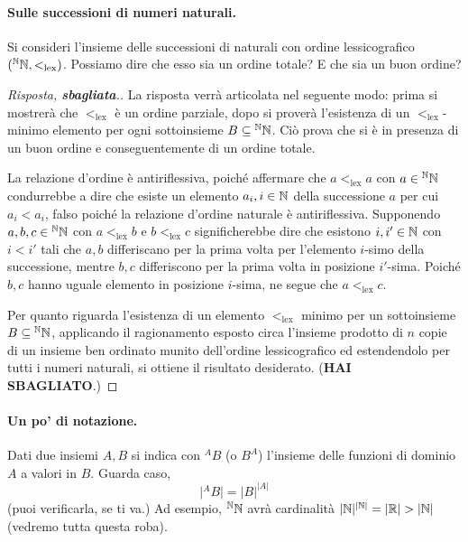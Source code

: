 \paragraph{Sulle successioni di numeri naturali.} Si consideri l'insieme delle successioni di naturali con ordine lessicografico \(({}^{\mathbb{N}}\mathbb{N}, <_{\mathrm{lex}})\). Possiamo dire che esso sia un ordine totale? E che sia un buon ordine?
\begin{proof}[Risposta, {\bf sbagliata}.]
  La risposta verrà articolata nel seguente modo: prima si mostrerà che \(<_{\mathrm{lex}}\) è un ordine parziale, dopo si proverà l'esistenza di un \(<_{\mathrm{lex}}\)-minimo elemento per ogni sottoinsieme \(B \subseteq {}^{\mathbb{N}}\mathbb{N}\). Ciò prova che si è in presenza di un buon ordine e conseguentemente di un ordine totale.

  La relazione d'ordine è antiriflessiva, poiché affermare che \(a <_{\mathrm{lex}} a\) con \(a \in {}^{\mathbb{N}}\mathbb{N}\) condurrebbe a dire che esiste un elemento \(a_i, i \in \mathbb{N}\) della successione \(a\) per cui \(a_i < a_i\), falso poiché la relazione d'ordine naturale è antiriflessiva. Supponendo \(a,b,c \in {}^{\mathbb{N}}\mathbb{N}\) con \(a <_{\mathrm{lex}} b\) e \(b <_{\mathrm{lex}} c\) significherebbe dire che esistono \(i,i' \in \mathbb{N}\) con \(i < i'\) tali che \(a,b\) differiscano per la prima volta per l'elemento \(i\)-simo della successione, mentre \(b,c\) differiscono per la prima volta in posizione \(i'\)-sima. Poiché \(b,c\) hanno uguale elemento in posizione \(i\)-sima, ne segue che \(a <_{\mathrm{lex}} c\).

  Per quanto riguarda l'esistenza di un elemento \(<_{\mathrm{lex}}\) minimo per un sottoinsieme \(B \subseteq {}^{\mathbb{N}}\mathbb{N}\), applicando il ragionamento esposto circa l'insieme prodotto di \(n\) copie di un insieme ben ordinato munito dell'ordine lessicografico ed estendendolo per tutti i numeri naturali, si ottiene il risultato desiderato. ({\bf HAI SBAGLIATO}.)
\end{proof}

\paragraph{Un po' di notazione.} Dati due insiemi \(A,B\) si indica con \({}^AB\) (o \(B^A\)) l'insieme delle funzioni di dominio \(A\) a valori in \(B\). Guarda caso,
\[
\lvert {}^AB\rvert = \lvert B \rvert^{\lvert A \rvert}
\]
(puoi verificarla, se ti va.) Ad esempio, \({}^{\mathbb{N}}\mathbb{N}\) avrà cardinalità \(\lvert\mathbb{N}\rvert^{\lvert\mathbb{N}\lvert} = \lvert\mathbb{R}\rvert > \lvert\mathbb{N}\rvert\) (vedremo tutta questa roba).

